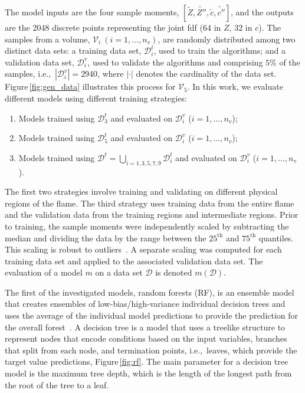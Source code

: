 \documentclass[review]{elsarticle}
\newcommand{\wt}[1]{\widetilde{#1}}
\begin{document}
The model inputs are the four sample moments,
$\left[ \wt{Z}, \wt{Z''}, \wt{c}, \wt{c''} \right]$, and the outputs
are the 2048 discrete points representing the joint \gls{fdf} ($64$ in
$Z$, $32$ in $c$). The samples from a volume,
$\mathcal{V}_i~(i=1,\dots, n_v)$, are randomly distributed among two
distinct data sets: a training data set, $\mathcal{D}_i^t$, used to
train the algorithms; and a validation data set, $\mathcal{D}_i^v$,
used to validate the algorithms and comprising $5\%$ of the samples,
i.e.,\ $|\mathcal{D}_i^v| = 2940$, where $|\cdot|$ denotes the
cardinality of the data set. Figure\,\ref{fig:gen_data} illustrates
this process for $\mathcal{V}_5$. In this work, we evaluate different
models using different training strategies:
\begin{enumerate}
\item Models trained using $\mathcal{D}_3^t$ and evaluated on $\mathcal{D}_i^v$ ($i=1, \dots, n_v$);
\item Models trained using $\mathcal{D}_5^t$ and evaluated on $\mathcal{D}_i^v$ ($i=1, \dots, n_v$);
\item Models trained using $\mathcal{D}^t = \bigcup\limits_{i=1, 3, 5, 7, 9} \mathcal{D}_i^t$ and evaluated on $\mathcal{D}_i^v$ ($i=1, \dots, n_v$).
\end{enumerate}
The first two strategies involve training and validating on different
physical regions of the flame. The third strategy uses training data
from the entire flame and the validation data from the training
regions and intermediate regions. Prior to training, the sample
moments were independently scaled by subtracting the median and
dividing the data by the range between the $25^\text{th}$ and
$75^\text{th}$ quantiles. This scaling is robust to
outliers~\cite{Pedregosa2011}. A separate scaling was computed for
each training data set and applied to the associated validation data
set. The evaluation of a model $m$ on a data set $\mathcal{D}$ is
denoted $m(\mathcal{D})$.

The first of the investigated models, random forests (RF), is an
ensemble model that creates ensembles of low-bias/high-variance
individual decision trees and uses the average of the individual model
predictions to provide the prediction for the overall
forest~\cite{Breiman2001}. A decision tree is a model that uses a
treelike structure to represent nodes that encode conditions based
on the input variables, branches that split from each node, and
termination points, i.e.,\ leaves, which provide the target value
predictions, Figure\,\ref{fig:rf}. The main parameter for a decision
tree model is the maximum tree depth, which is the length of the
longest path from the root of the tree to a leaf.
\end{document}
